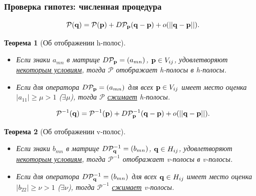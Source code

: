 \documentclass [10pt] {beamer}
\newtheorem{thm}{Теорема}
\begin{document}
\begin{frame}
	\frametitle{Проверка гипотез: численная процедура}
	
	\begin{equation*}
		\mathcal{P}(\vb{q}) = \mathcal{P}(\vb{p}) + D \mathcal{P}_{\vb{p}} (\vb{q} - \vb{p}) + o(||\vb{q} - \vb{p}||).
	\end{equation*}
	
	\begin{thm}[Об отображении h-полос]
		\begin{itemize}
			\item Если знаки $a_{mn}$ в матрице $D \mathcal{P}_{\vb{p}} = (a_{mn})$, $\vb{p} \in V_{ij}$, удовлетворяют \underline{некоторым условиям}, тогда $\mathcal{P}$ отображает h-полосы в h-полосы.
			\item Если для оператора $D \mathcal{P}_{\vb{p}} = (a_{mn})$ для всех $\vb{p} \in V_{ij}$ имеет место оценка $|a_{11}| \ge \mu > 1$ ($\exists \mu$), тогда $\mathcal{P}$ \underline{сжимает} h-полосы.
		\end{itemize}
	\end{thm}
	\begin{equation*}
		\mathcal{P}^{-1}(\vb{q}) = \mathcal{P}^{-1}(\vb{p}) + D \mathcal{P}^{-1}_{\vb{p}} (\vb{q} - \vb{p}) + o(||\vb{q} - \vb{p}||).
	\end{equation*}
	\begin{thm}[Об отображении v-полос]
		\begin{itemize}
			\item Если знаки $b_{mn}$ в матрице $D \mathcal{P}_{\vb{q}}^{-1} = (b_{mn})$, $\vb{q} \in H_{ij}$, удовлетворяют \underline{некоторым условиям}, тогда $\mathcal{P}^{-1}$ отображает v-полосы в v-полосы.
			\item Если для оператора $D \mathcal{P}_{\vb{q}}^{-1} = (b_{mn})$ для всех $\vb{q} \in H_{ij}$ имеет место оценка $|b_{22}| \ge \nu > 1$ ($\exists \nu$), тогда $\mathcal{P}^{-1}$ \underline{сжимает} v-полосы.
		\end{itemize}
	\end{thm}
\end{frame}
\end{document}
